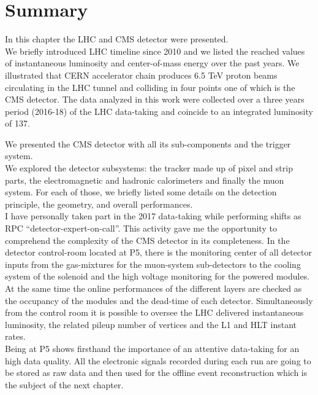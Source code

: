 \clearpage
\section{Summary}\label{sec:summaryC2}

In this chapter the LHC and CMS detector were presented.\\
We briefly introduced LHC timeline since 2010 and we listed the
reached values of instantaneous luminosity and center-of-mass energy
over the past years.
We illustrated that CERN accelerator chain produces
6.5 TeV proton beams circulating in the LHC tunnel and colliding in
four points one of which is the CMS detector. The data analyzed in
this work were collected over a three years period (2016-18) of the
LHC data-taking and coincide to an integrated luminosity of
137\fbinv.

We presented the CMS detector with all its sub-components and the
trigger system.\\
We explored the detector subsystems: the tracker made up of pixel and
strip parts, the electromagnetic
and hadronic calorimeters and finally the muon system. For each of
those, we briefly listed some details on the detection principle,
the geometry, and overall performances. \\

I have personally taken part in the 2017 data-taking while performing
shifts as RPC ``detector-expert-on-call''. This activity gave me the
opportunity to comprehend the complexity of the CMS detector in its
completeness. In the detector control-room located at P5, there is the
monitoring center of all detector inputs from the gas-mixtures
for the muon-system sub-detectors to the cooling system of the
solenoid and the high voltage monitoring for the powered
modules. At the same time the online performances of the different layers
are checked as the occupancy of the modules and the dead-time of each
detector. Simultaneously from the control room it is possible to oversee the LHC
delivered instantaneous luminosity, the related pileup number of
vertices and the L1 and HLT instant rates. \\
Being at P5 shows firsthand the importance of an attentive
data-taking for an high data quality. All the electronic
signals recorded during each run are going to be stored as raw data
and then used for the offline event
reconstruction which is the subject of the next chapter.